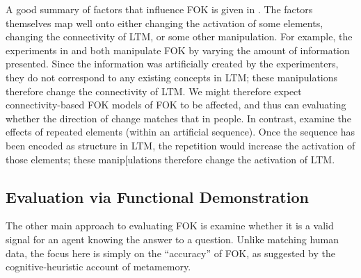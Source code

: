 \documentclass[10pt,letterpaper]{article}
\newcommand{\textcite}[1]{\citeauthor{#1} \citeyear{#1}}
\begin{document}

A good summary of factors that influence FOK is given in \textcite{Schwartz1994SourcesOfInformation}.
The factors themselves map well onto either changing the activation of some elements, changing the connectivity of LTM, or some other manipulation.
For example, the experiments in \textcite{Metcalfe1993TheCueFamiliarity} and \textcite{Schwartz2014ContextualInformationInfluences} both manipulate FOK by varying the amount of information presented.
Since the information was artificially created by the experimenters, they do not correspond to any existing concepts in LTM; these manipulations therefore change the connectivity of LTM.
We might therefore expect connectivity-based FOK models of FOK to be affected, and thus can evaluating whether the direction of change matches that in people.
In contrast, \textcite{Florer2000FeelingsOfKnowing} examine the effects of repeated elements (within an artificial sequence).
Once the sequence has been encoded as structure in LTM, the repetition would increase the activation of those elements; these manip[ulations therefore change the activation of LTM.


\subsection{Evaluation via Functional Demonstration}

The other main approach to evaluating FOK is examine whether it is a valid signal for an agent knowing the answer to a question.
Unlike matching human data, the focus here is simply on the ``accuracy'' of FOK, as suggested by the cognitive-heuristic account of metamemory.

\end{document}

